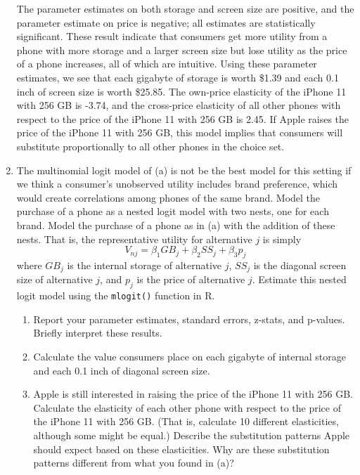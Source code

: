 \documentclass[11pt,letterpaper]{article}\usepackage[]{graphicx}\usepackage[]{color}
\begin{document}
\begin{enumerate}[label=\alph*., leftmargin=*]
	The parameter estimates on both storage and screen size are positive, and the parameter estimate on price is negative; all estimates are statistically significant. These result indicate that consumers get more utility from a phone with more storage and a larger screen size but lose utility as the price of a phone increases, all of which are intuitive. Using these parameter estimates, we see that each gigabyte of storage is worth \$1.39 and each 0.1 inch of screen size is worth \$25.85. The own-price elasticity of the iPhone 11 with 256 GB is -3.74, and the cross-price elasticity of all other phones with respect to the price of the iPhone 11 with 256 GB is 2.45. If Apple raises the price of the iPhone 11 with 256 GB, this model implies that consumers will substitute proportionally to all other phones in the choice set.

	\item The multinomial logit model of (a) is not be the best model for this setting if we think a consumer's unobserved utility includes brand preference, which would create correlations among phones of the same brand. Model the purchase of a phone as a nested logit model with two nests, one for each brand. Model the purchase of a phone as in (a) with the addition of these nests. That is, the representative utility for alternative $j$ is simply
	$$V_{nj} = \beta_1 GB_j + \beta_2 SS_j + \beta_3 p_j$$
	where $GB_j$ is the internal storage of alternative $j$, $SS_j$ is the diagonal screen size of alternative $j$, and $p_j$ is the price of alternative $j$. Estimate this nested logit model using the \texttt{mlogit()} function in R. 
	\begin{enumerate}[label=\roman*.]
		\item Report your parameter estimates, standard errors, z-stats, and p-values. Briefly interpret these results. 
		\item Calculate the value consumers place on each gigabyte of internal storage and each 0.1 inch of diagonal screen size.
		\item Apple is still interested in raising the price of the iPhone 11 with 256 GB. Calculate the elasticity of each other phone with respect to the price of the iPhone 11 with 256 GB. (That is, calculate 10 different elasticities, although some might be equal.) Describe the substitution patterns Apple should expect based on these elasticities. Why are these substitution patterns different from what you found in (a)?
	\end{enumerate}


\end{enumerate}
\end{document}
